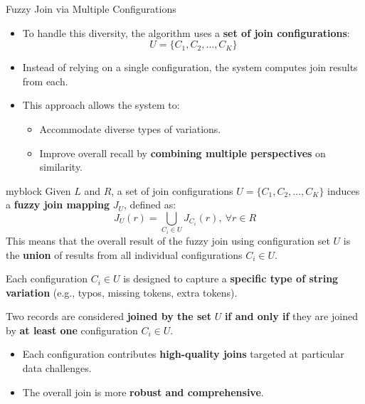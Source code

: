 \documentclass[8pt]{beamer} %
\begin{document}
\begin{frame}{Fuzzy Join via Multiple Configurations}
	
	\begin{itemize}
		\item To handle this diversity, the algorithm uses a \textbf{set of join configurations}:
		\[
		U = \{C_1, C_2, \dots, C_K\}
		\]
		\item Instead of relying on a single configuration, the system computes join results from each.
		\item This approach allows the system to:
		\begin{itemize}
			\item Accommodate diverse types of variations.
			\item Improve overall recall by \textbf{combining multiple perspectives} on similarity.
		\end{itemize}
	\end{itemize}
	
	\vspace{1em}
	
	\begin{beamercolorbox}[rounded=true, shadow=true, leftskip=1em, rightskip=1em]{myblock}
		Given $L$ and $R$, a set of join configurations $U = \{C_1, C_2, \ldots, C_K\}$ induces a \textbf{fuzzy join mapping} $J_U$, defined as:
		\[
		J_U(r) = \bigcup_{C_i \in U} J_{C_i}(r),\ \forall r \in R \tag{2}
		\]
		This means that the overall result of the fuzzy join using configuration set $U$ is the \textbf{union} of results from all individual configurations $C_i \in U$.
	\end{beamercolorbox}
	
	\vspace{0.5em}
	
	Each configuration $C_i \in U$ is designed to capture a \textbf{specific type of string variation} (e.g., typos, missing tokens, extra tokens).
	
	Two records are considered \textbf{joined by the set} $U$ \textbf{if and only if} they are joined by \textbf{at least one} configuration $C_i \in U$.
	
	\begin{itemize}
		\item Each configuration contributes \textbf{high-quality joins} targeted at particular data challenges.
		\item The overall join is more \textbf{robust and comprehensive}.
	\end{itemize}
	

	
\end{frame}
\end{document}
